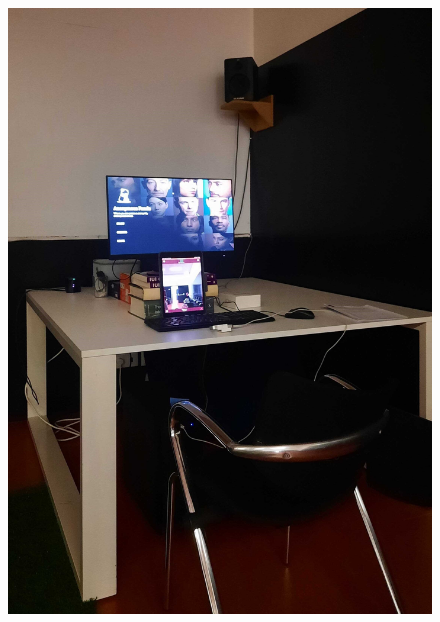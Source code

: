 \begin{figure}[!htb]
\centering
    \begin{minipage}{0.49\textwidth}
        \centering
        \includegraphics[width=0.84\linewidth]{figures/setup.jpg}
        \label{fig:setup}
    \end{minipage}
    \begin{minipage}{0.49\textwidth}
        \centering

\end{minipage}
\end{figure}
